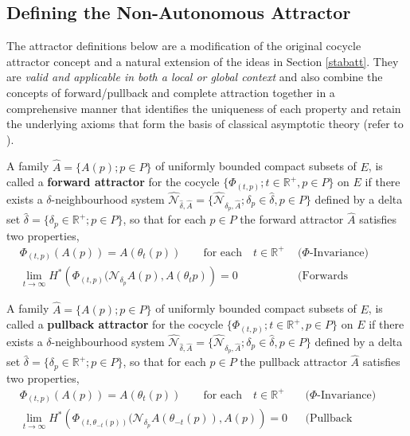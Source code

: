 \subsection{Defining the Non-Autonomous Attractor}

The attractor definitions below are a modification of the original
cocycle attractor concept and a natural extension of the ideas in
Section \ref{stabatt}. They are \textit{valid and applicable in both a local or
global context}  and also combine the concepts of forward/pullback and
complete attraction together in a comprehensive manner that identifies the
uniqueness of each property and retain the underlying axioms that form the basis
of classical asymptotic theory (refer to \cite{BhSz67,Yo66}).

\begin{defn} \label{FAdef}
   A family $\hat{A} = \{A(p);p \in P\}$ of uniformly bounded compact
   subsets of $E$, is called a {\bf forward attractor} for the cocycle
   $\{\Phi_{(t,p)}; t \in \mathbb{R}^{+},p \in P\}$ on $E$ if there exists
   a $\delta$-neighbourhood system $\hat{\mathcal{N}}_{\hat{\delta}
   ,\hat{A}} = \{\hat{\mathcal{N}}_{\delta_p, \hat{A}}; \delta_p \in
   \hat{\delta}, p \in P \}$ defined by a delta set $\hat{\delta} =
   \{\delta_p \in \mathbb{R}^+; p\in P\}$, so that for each $p \in P$ the
   forward attractor $\hat{A}$ satisfies two properties,
   \begin{align} \label{FAInv}
      & \Phi_{(t,p)} \left(A(p)\right)=A(\theta_t(p)) \qquad \text{for each}
          \quad t \in \mathbb{R}^{+} & & \text{($\Phi$-Invariance)} \\
      \label{FAFC}
      & \lim_{t \to \infty} H^{*} \left(\Phi_{(t,p)}
           (\mathcal{N}_{\delta_p}A(p),A(\theta_t p)
           \right) = 0 & & \text{(Forwards Convergence)}
   \end{align}
\end{defn}

\begin{defn} \label{PAdef}
   A family $\hat{A} = \{A(p);p \in P\}$ of uniformly bounded compact
   subsets of $E$, is called a {\bf pullback attractor} for the
   cocycle $\{\Phi_{(t,p)}; t \in \mathbb{R}^{+},p \in P\}$ on $E$ if there
   exists a $\delta$-neighbourhood system
   $\hat{\mathcal{N}}_{\hat{\delta} ,\hat{A}} =
   \{\hat{\mathcal{N}}_{\delta_p, \hat{A}}; \delta_p \in
   \hat{\delta}, p \in P \}$ defined by a delta set $\hat{\delta} =
   \{\delta_p \in \mathbb{R}^+; p\in P\}$, so that for each $p \in P$ the
   pullback attractor $\hat{A}$ satisfies two properties,
   \begin{align} \label{PAInv}
      & \Phi_{(t,p)} \left(A(p)\right)=A(\theta_t(p)) \qquad \text{for each}
          \quad t \in \mathbb{R}^{+} & & \text{($\Phi$-Invariance)} \\
      \label{PAPC}
      & \lim_{t \to \infty} H^{*} \left(\Phi_{(t,\theta_{-t}(p))}
           (\mathcal{N}_{\delta_p}A(\theta_{-t}(p)),A(p)
           \right) = 0 & & \text{(Pullback Convergence)}
   \end{align}
\end{defn}

